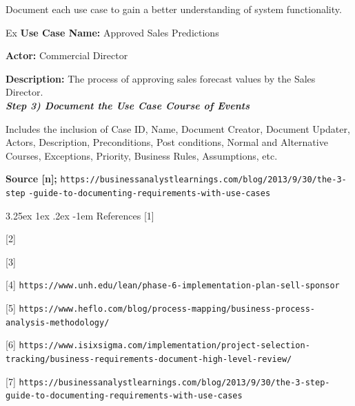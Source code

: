 \documentclass{article}
\makeatletter
\renewcommand\subparagraph{\@startsection{subparagraph}{6}{\parindent}%
  {3.25ex \@plus1ex \@minus .2ex}%
  {-1em}%
  {\normalfont\normalsize\bfseries}}
\makeatother
\begin{document}
{\vspace{0.25cm}

Document each use case to gain a better understanding of system functionality. 

\hspace{-0.65cm} Ex \textbf{Use Case Name:} Approved Sales Predictions 

\textbf{Actor:} Commercial Director
 
\textbf{Description:} The process of approving sales forecast values by the Sales Director. \\

\textbf{\textit{Step 3) Document the Use Case Course of Events}}

\vspace{0.25cm}

Includes the inclusion of Case ID, Name, Document Creator, Document Updater, Actors, Description, Preconditions, Post conditions, Normal and Alternative Courses, Exceptions, Priority, Business Rules, Assumptions, etc.

\vspace{0.15cm}

\vspace{3.35cm}

\hspace{-0.65cm} \textbf{Source [n];} \hspace{0.35cm} \texttt{https://businessanalystlearnings.com/blog/2013/9/30/the-3-step}
\texttt{-guide-to-documenting-requirements-with-use-cases} 


}


\newpage

\subparagraph{References}
[1] \texttt{}

\hspace{-0.63cm} [2] \texttt{}

\hspace{-0.63cm} [3] \texttt{}

\hspace{-0.63cm} [4] \texttt{https://www.unh.edu/lean/phase-6-implementation-plan-sell-sponsor}

\hspace{-0.63cm} [5]  \texttt{https://www.heflo.com/blog/process-mapping/business-process-analysis-methodology/}

\hspace{-0.63cm} [6] \texttt{https://www.isixsigma.com/implementation/project-selection-tracking/business-requirements-document-high-level-review/}

\hspace{-0.63cm} [7] \texttt{https://businessanalystlearnings.com/blog/2013/9/30/the-3-step-guide-to-documenting-requirements-with-use-cases}
\end{document}
